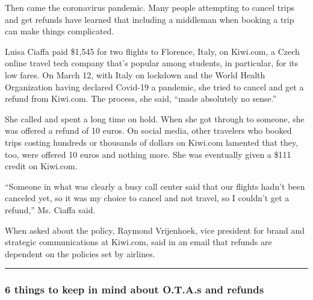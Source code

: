 Then came the coronavirus pandemic. Many people attempting to cancel
trips and get refunds have learned that including a middleman when
booking a trip can make things complicated.

Luisa Ciaffa paid \$1,545 for two flights to Florence, Italy, on
Kiwi.com, a Czech online travel tech company that's popular among
students, in particular, for its low fares. On March 12, with Italy on
lockdown and the World Health Organization having declared Covid-19 a
pandemic, she tried to cancel and get a refund from Kiwi.com. The
process, she said, ``made absolutely no sense.''

She called and spent a long time on hold. When she got through to
someone, she was offered a refund of 10 euros. On social media, other
travelers who booked trips costing hundreds or thousands of dollars on
Kiwi.com lamented that they, too, were offered 10 euros and nothing
more. She was eventually given a \$111 credit on Kiwi.com.

``Someone in what was clearly a busy call center said that our flights
hadn't been canceled yet, so it was my choice to cancel and not travel,
so I couldn't get a refund,'' Ms. Ciaffa said.

When asked about the policy, Raymond Vrijenhoek, vice president for
brand and strategic communications at Kiwi.com, said in an email that
refunds are dependent on the policies set by airlines.

\begin{center}\rule{0.5\linewidth}{\linethickness}\end{center}

\hypertarget{6-things-to-keep-in-mind-about-otas-and-refunds}{%
\subsubsection{6 things to keep in mind about O.T.A.s and
refunds}\label{6-things-to-keep-in-mind-about-otas-and-refunds}}

